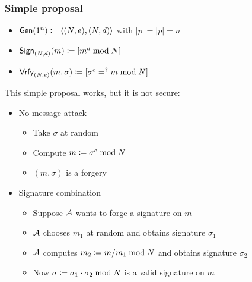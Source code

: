 \documentclass[12pt]{article}
\begin{document}
\subsubsection{Simple proposal}
\begin{itemize}
	\item $\operatorname{\mathsf{Gen}}(1^n)\coloneqq \langle (N,e), (N,d)\rangle $ with $|p|=|p|=n$
	\item $\operatorname{\mathsf{Sign}}_{(N,d)}(m) \coloneqq [m^d \bmod{N}]$
	\item $\operatorname{\mathsf{Vrfy}}_{(N,e)}(m,\sigma) \coloneqq [\sigma^e =^? m \bmod{N}]$
\end{itemize}
This simple proposal works, but it is not secure:
\begin{itemize}
	\item No-message attack
	\begin{itemize}
		\item Take $\sigma$ at random
		\item Compute $m \coloneqq \sigma^e \bmod{N}$
		\item $(m,\sigma)$ is a forgery
	\end{itemize}
	\item Signature combination
	\begin{itemize}
		\item Suppose $\mathcal{A}$ wants to forge a signature on $m$
		\item $\mathcal{A}$ chooses $m_1$ at random and obtains signature $\sigma_1$
		\item $\mathcal{A}$ computes $m_2 \coloneqq m/m_1 \bmod{N}$ and obtains signature $\sigma_2$
		\item Now $\sigma \coloneqq \sigma_1 \cdot \sigma_2 \bmod{N}$ is a valid signature on $m$
	\end{itemize}	
\end{itemize}
\end{document}
